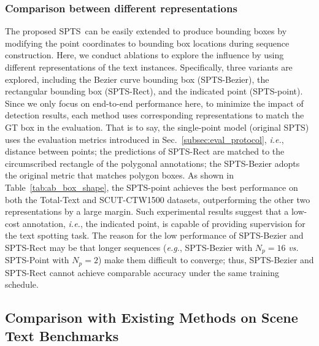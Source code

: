 \documentclass[sigconf]{acmart}
\newcommand{\methodName}{SPTS}
\begin{document}
\subsubsection{Comparison between different representations}
\label{sec_rect_bezier}
The proposed \methodName\ can be easily extended to produce bounding boxes by modifying the point coordinates to bounding box locations during sequence construction. Here, we conduct ablations to explore the influence by using different representations of the text instances. Specifically, three variants are explored, including the Bezier curve bounding box (\methodName-Bezier), the rectangular bounding box (SPTS-Rect), and the indicated point (\methodName-point). Since we only focus on end-to-end performance here, to minimize the impact of detection results, each method uses corresponding representations to match the GT box in the evaluation. That is to say, the single-point model (original \methodName) uses the evaluation metrics introduced in Sec.~\ref{subsec:eval_protocol}, \emph{i.e.}, distance between points; the predictions of \methodName-Rect are matched to the circumscribed rectangle of the polygonal annotations; the \methodName-Bezier adopts the original metric that matches polygon boxes. As shown in Table~\ref{tab:ab_box_shape}, the \methodName-point achieves the best performance on both the Total-Text and SCUT-CTW1500 datasets, outperforming the other two representations by a large margin. Such experimental results suggest that a low-cost annotation, \emph{i.e.}, the indicated point, is capable of providing supervision for the text spotting task. The reason for the low performance of \methodName-Bezier and \methodName-Rect may be that longer sequences (\emph{e.g.}, \methodName-Bezier with $N_{p}=16$ \emph{vs.} \methodName-Point with $N_{p}=2$) make them difficult to converge; thus, \methodName-Bezier and \methodName-Rect cannot achieve comparable accuracy under the same training schedule.

\subsection{Comparison with Existing Methods on Scene Text Benchmarks}
\end{document}
